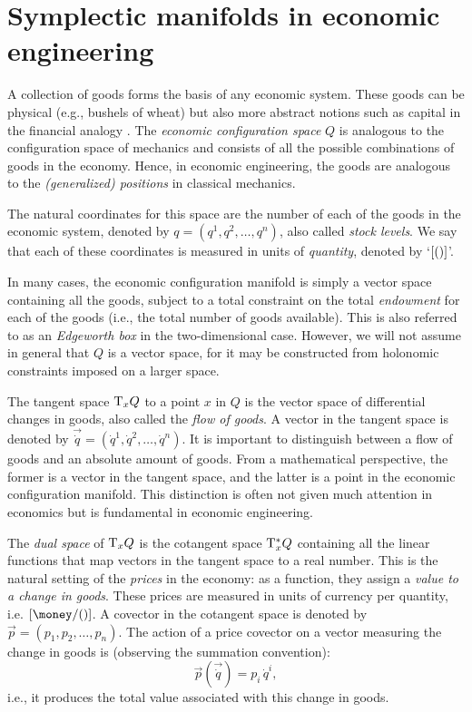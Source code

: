 \section{Symplectic manifolds in economic engineering}
\label{sec:symplectic_ee}
A collection of goods forms the basis of any economic system. These goods can be physical (e.g., bushels of wheat) but also more abstract notions such as capital in the financial analogy \cite{Kruimer2021}. The \emph{economic configuration space} \(Q\) is analogous to the configuration space of mechanics and consists of all the possible combinations of goods in the economy. 
Hence, in economic engineering, the goods are analogous to the \emph{(generalized) positions} in classical mechanics. 

The natural coordinates for this space are the number of each of the goods in the economic system, denoted by \(q = (q^1, q^2, \ldots, q^n)\), also called \emph{stock levels}. We say that each of these coordinates is measured in units of \emph{quantity}, denoted by `\(\qty[\si{\quantity}]\)'. 

In many cases, the economic configuration manifold is simply a vector space containing all the goods, subject to a total constraint on the total \emph{endowment} for each of the goods (i.e., the total number of goods available). This is also referred to as an \emph{Edgeworth box} in the two-dimensional case. However, we will not assume in general that $Q$ is a vector space, for it may be constructed from holonomic constraints imposed on a larger space.

The tangent space \(\mathrm{T}_{x} Q\) to a point \(x\) in \(Q\) is the vector space of differential changes in goods, also called the \emph{flow of goods}. A vector in the tangent space is denoted by \(\vec{\dot{q}} = (\dot{q}^1, \dot{q}^2, \ldots, \dot{q}^n)\). It is important to distinguish between a flow of goods and an absolute amount of goods. From a mathematical perspective, the former is a vector in the tangent space, and the latter is a point in the economic configuration manifold. This distinction is often not given much attention in economics but is fundamental in economic engineering.

The \emph{dual space} of \(\mathrm{T}_{x} Q\) is the cotangent space \(\mathrm{T}_{x}^*Q\) containing all the linear functions that map vectors in the tangent space to a real number. This is the natural setting of the \emph{prices} in the economy: as a function, they assign a \emph{value to a change in goods}. These prices are measured in units of currency per quantity, i.e. \(\qty[\si{\money \per \quantity}]\). A covector in the cotangent space is denoted by \(\vec{p} = (p_1, p_2, \ldots, p_n)\). The action of a price covector on a vector measuring the change in goods is (observing the summation convention):
\begin{equation}
    \vec{p}(\vec{\dot{q}}) = p_i\,\dot{q}^i,
\end{equation}
i.e., it produces the total value associated with this change in goods.

